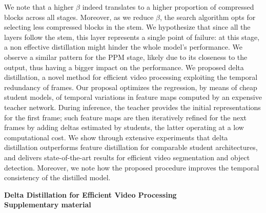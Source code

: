 \documentclass[runningheads]{llncs}
\newcommand{\opensupplement}{
    \setcounter{section}{0}
    \renewcommand\thesection{\Alph{section}}
}
\begin{document}
We note that a higher $\beta$ indeed translates to a higher proportion of compressed blocks across all stages. Moreover, as we reduce $\beta$, the search algorithm opts for selecting less compressed blocks in the stem. We hypothesize that since all the layers follow the stem, this layer represents a single point of failure: at this stage, a non effective distillation might hinder the whole model's performance. We observe a similar pattern for the PPM stage, likely due to its closeness to the output, thus having a bigger impact on the performance.
\label{sec:conclusion}
We proposed delta distillation, a novel method for efficient video processing exploiting the temporal redundancy of frames.
Our proposal optimizes the regression, by means of cheap student models, of temporal variations in feature maps computed by an expensive teacher network.
During inference, the teacher provides the initial representations for the first frame; 
such feature maps are then iteratively refined for the next frames by adding deltas estimated by students, the latter operating at a low computational cost.
We show through extensive experiments that delta distillation outperforms feature distillation for comparable student architectures, and delivers state-of-the-art results for efficient video segmentation and object detection.
Moreover, we note how the proposed procedure improves the temporal consistency of the distilled model.
% 

\clearpage
\opensupplement
\begin{center}
    \large \textbf{Delta Distillation for Efficient Video Processing\\Supplementary material}
\end{center}
\end{document}
